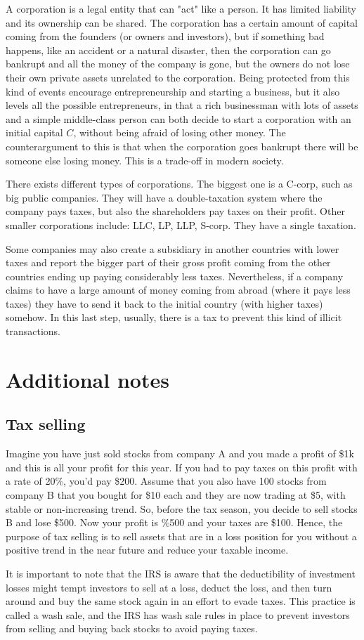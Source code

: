 A corporation is a legal entity that can "act" like a person. It has limited liability and its ownership can be shared. The corporation has a certain amount of capital coming from the founders (or owners and investors), but if something bad happens, like an accident or a natural disaster, then the corporation can go bankrupt and all the money of the company is gone, but the owners do not lose their own private assets unrelated to the corporation. Being protected from this kind of events encourage entrepreneurship and starting a business, but it also levels all the possible entrepreneurs, in that a rich businessman with lots of assets and a simple middle-class person can both decide to start a corporation with an initial capital $C$, without being afraid of losing other money. The counterargument to this is that when the corporation goes bankrupt there will be someone else losing money. This is a trade-off in modern society.

There exists different types of corporations. The biggest one is a C-corp, such as big public companies. They will have a double-taxation system where the company pays taxes, but also the shareholders pay taxes on their profit. Other smaller corporations include: LLC, LP, LLP, S-corp. They have a single taxation. 

Some companies may also create a subsidiary in another countries with lower taxes and report the bigger part of their gross profit coming from the other countries ending up paying considerably less taxes. Nevertheless, if a company claims to have a large amount of money coming from abroad (where it pays less taxes) they have to send it back to the initial country (with higher taxes) somehow. In this last step, usually, there is a tax to prevent this kind of illicit transactions.

\section{Additional notes}

\subsection{Tax selling}
Imagine you have just sold stocks from company A and you made a profit of \$1k and this is all your profit for this year. If you had to pay taxes on this profit with a rate of 20\%, you'd pay \$200. Assume that you also have 100 stocks from company B that you bought for \$10 each and they are now trading at \$5, with stable or non-increasing trend. So, before the tax season, you decide to sell stocks B and lose \$500. Now your profit is \%500 and your taxes are \$100. Hence, the purpose of tax selling is to sell assets that are in a loss position for you without a positive trend in the near future and reduce your taxable income.

It is important to note that the IRS is aware that the deductibility of investment losses might tempt investors to sell at a loss, deduct the loss, and then turn around and buy the same stock again in an effort to evade taxes. This practice is called a wash sale, and the IRS has wash sale rules in place to prevent investors from selling and buying back stocks to avoid paying taxes.
